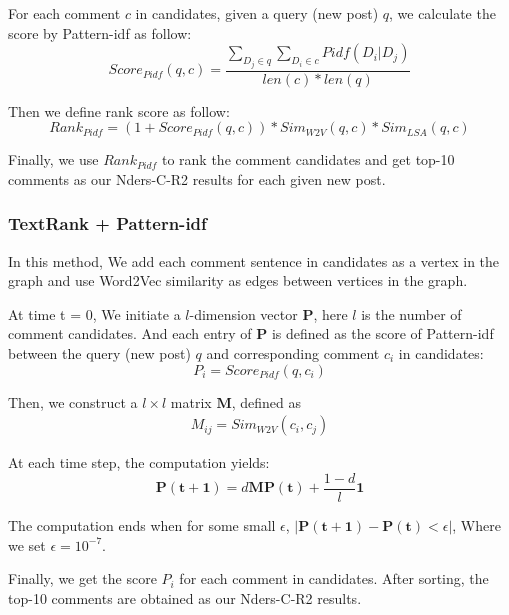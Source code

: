 \documentclass{sig-alternate}
\begin{document}
For each comment $c$ in candidates, given a query (new post) $q$, we calculate the score by Pattern-idf as follow:
\begin{equation}
  Score_{Pidf}(q, c) = \frac{\sum_{D_j \in q}{\sum_{D_i \in c}{Pidf(D_i|D_j)}}}{len(c) * len(q)}
\end{equation}

Then we define rank score as follow:
\begin{equation}
  Rank_{Pidf} = (1 + Score_{Pidf}(q, c)) * Sim_{W2V}(q, c)*Sim_{LSA}(q, c)  
\end{equation}

Finally, we use $Rank_{Pidf}$ to rank the comment candidates and get top-10 comments as our Nders-C-R2 results for each given new post.

\subsubsection{TextRank + Pattern-idf}
In this method, We add each comment sentence in candidates as a vertex in the 
graph and use Word2Vec similarity as edges between vertices in the graph. 

At time t = 0, We initiate a $l$-dimension vector $\bm{P}$, here $l$ is the 
number of comment candidates. And each entry of $\bm{P}$ is defined as the 
score of Pattern-idf between the query (new post) $q$ and corresponding comment
$c_i$ in candidates:
\begin{equation}
  P_i = Score_{Pidf}(q, c_i)
\end{equation} 

Then, we construct a $l \times l$ matrix $\bm{M}$, defined as
\begin{equation}
  \begin{aligned}
    M_{ij} = Sim_{W2V}(c_i, c_j)
  \end{aligned}
\end{equation}

At each time step, the computation yields:
\begin{equation}
  \bm{P(t+1)} = d\bm{M}\bm{P(t)} + \frac{1-d}{l} \bm{1}
\end{equation}

The computation ends when for some small $\epsilon$, $|\bm{P(t+1)} - \bm{P(t)} < \epsilon|$, Where we set $\epsilon = 10^{-7}$.

Finally, we get the score $P_i$ for each comment in candidates. After sorting, 
the top-10 comments are obtained as our Nders-C-R2 results.
\end{document}
